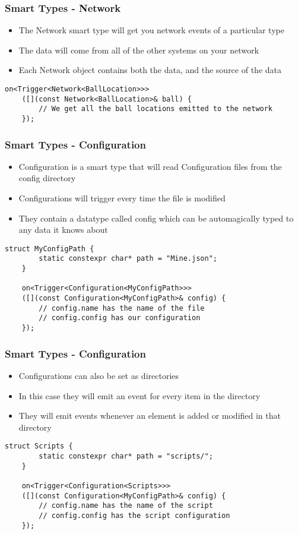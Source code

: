 \documentclass{beamer}
\begin{document}
\begin{frame}[fragile]
	\frametitle{Smart Types - Network}
	\begin{itemize}
		\item The Network smart type will get you network events of a particular type
		\item The data will come from all of the other systems on your network
		\item Each Network object contains both the data, and the source of the data
	\end{itemize}
	
	\begin{lstlisting}[language=nuclear]
	on<Trigger<Network<BallLocation>>>
	([](const Network<BallLocation>& ball) {
	    // We get all the ball locations emitted to the network
	});
	\end{lstlisting}
\end{frame}

\begin{frame}[fragile]
	\frametitle{Smart Types - Configuration}
	\begin{itemize}
		\item Configuration is a smart type that will read Configuration files from the config directory
		\item Configurations will trigger every time the file is modified
		\item They contain a datatype called config which can be automagically typed to any data it knows about
	\end{itemize}
	
	\begin{lstlisting}[language=nuclear]
	struct MyConfigPath {
	    static constexpr char* path = "Mine.json";
	}
	
	on<Trigger<Configuration<MyConfigPath>>>
	([](const Configuration<MyConfigPath>& config) {
	    // config.name has the name of the file
	    // config.config has our configuration
	});
	\end{lstlisting}
\end{frame}

\begin{frame}[fragile]
	\frametitle{Smart Types - Configuration}
	
	\begin{itemize}
		\item Configurations can also be set as directories
		\item In this case they will emit an event for every item in the directory
		\item They will emit events whenever an element is added or modified in that directory
	\end{itemize}
	
	\begin{lstlisting}[language=nuclear]
	struct Scripts {
	    static constexpr char* path = "scripts/";
	}
	
	on<Trigger<Configuration<Scripts>>>
	([](const Configuration<MyConfigPath>& config) {
	    // config.name has the name of the script
	    // config.config has the script configuration
	});
	\end{lstlisting}
\end{frame}
\end{document}
